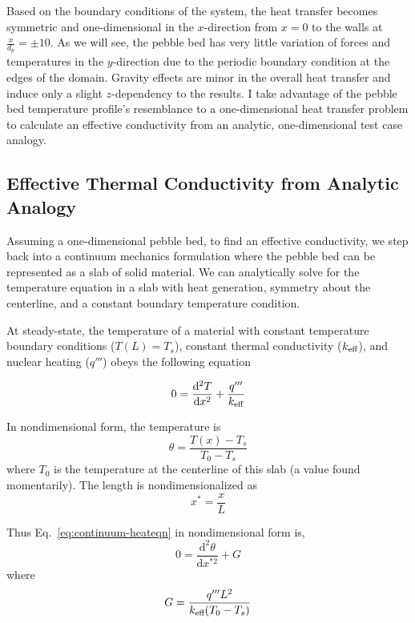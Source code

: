 Based on the boundary conditions of the system, the heat transfer becomes symmetric and one-dimensional in the $x$-direction from $x=0$ to the walls at $\frac{x}{d_p} = \pm 10$. As we will see, the pebble bed has very little variation of forces and temperatures in the $y$-direction due to the periodic boundary condition at the edges of the domain. Gravity effects are minor in the overall heat transfer and induce only a slight $z$-dependency to the results. I take advantage of the pebble bed temperature profile's resemblance to a one-dimensional heat transfer problem to calculate an effective conductivity from an analytic, one-dimensional test case analogy.





\subsection{Effective Thermal Conductivity from Analytic Analogy}\label{sec:keff-analogy}
Assuming a one-dimensional pebble bed, to find an effective conductivity, we step back into a continuum mechanics formulation where the pebble bed can be represented as a slab of solid material. We can analytically solve for the temperature equation in a slab with heat generation, symmetry about the centerline, and a constant boundary temperature condition.

At steady-state, the temperature of a material with constant temperature boundary conditions ($T(L) = T_s$), constant thermal conductivity ($k_\text{eff}$), and nuclear heating ($q'''$) obeys the following equation

\begin{equation}\label{eq:continuum-heateqn}
    0 = \frac{\mathrm{d}^2T}{\mathrm{d}x^2} + \frac{q'''}{k_\text{eff}}
\end{equation}

In nondimensional form, the temperature is
\begin{equation}
    \theta = \frac{T(x) - T_s}{T_0 - T_s}
\end{equation}
where $T_0$ is the temperature at the centerline of this slab (a value found momentarily). The length is nondimensionalized as
\begin{equation}
    x^* = \frac{x}{L}
\end{equation}

Thus Eq.~\ref{eq:continuum-heateqn} in nondimensional form is,
\begin{equation}\label{eq:continuum-heateqn-nondim}
    0 = \frac{\mathrm{d}^2\theta}{\mathrm{d}x^{*2}} + G
\end{equation}
where
\begin{equation}
    G = \frac{q'''L^2}{k_\text{eff}(T_0 - T_s)}
\end{equation}

